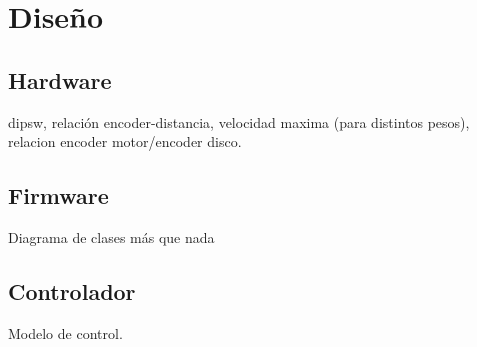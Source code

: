 \chapter{Diseño}
\thispagestyle{empty}



\section{Hardware}
dipsw, relación encoder-distancia, velocidad maxima (para distintos pesos), relacion encoder motor/encoder disco.

\section{Firmware}
Diagrama de clases más que nada

\section{Controlador}
Modelo de control.
